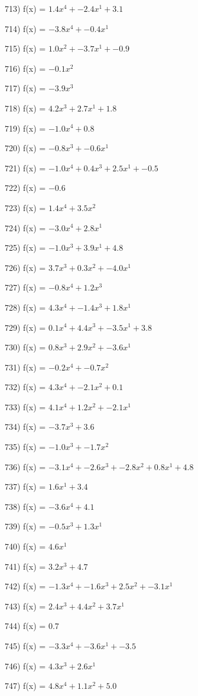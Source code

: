 \documentclass[10pt,a4paper]{article}
\begin{document}
713) f(x) = $1.4x^4 + -2.4x^1 + 3.1$

714) f(x) = $-3.8x^4 + -0.4x^1$

715) f(x) = $1.0x^2 + -3.7x^1 + -0.9$

716) f(x) = $-0.1x^2$

717) f(x) = $-3.9x^3$

718) f(x) = $4.2x^3 + 2.7x^1 + 1.8$

719) f(x) = $-1.0x^4 + 0.8$

720) f(x) = $-0.8x^3 + -0.6x^1$

721) f(x) = $-1.0x^4 + 0.4x^3 + 2.5x^1 + -0.5$

722) f(x) = $-0.6$

723) f(x) = $1.4x^4 + 3.5x^2$

724) f(x) = $-3.0x^4 + 2.8x^1$

725) f(x) = $-1.0x^3 + 3.9x^1 + 4.8$

726) f(x) = $3.7x^3 + 0.3x^2 + -4.0x^1$

727) f(x) = $-0.8x^4 + 1.2x^3$

728) f(x) = $4.3x^4 + -1.4x^3 + 1.8x^1$

729) f(x) = $0.1x^4 + 4.4x^3 + -3.5x^1 + 3.8$

730) f(x) = $0.8x^3 + 2.9x^2 + -3.6x^1$

731) f(x) = $-0.2x^4 + -0.7x^2$

732) f(x) = $4.3x^4 + -2.1x^2 + 0.1$

733) f(x) = $4.1x^4 + 1.2x^2 + -2.1x^1$

734) f(x) = $-3.7x^3 + 3.6$

735) f(x) = $-1.0x^3 + -1.7x^2$

736) f(x) = $-3.1x^4 + -2.6x^3 + -2.8x^2 + 0.8x^1 + 4.8$

737) f(x) = $1.6x^1 + 3.4$

738) f(x) = $-3.6x^4 + 4.1$

739) f(x) = $-0.5x^3 + 1.3x^1$

740) f(x) = $4.6x^1$

741) f(x) = $3.2x^3 + 4.7$

742) f(x) = $-1.3x^4 + -1.6x^3 + 2.5x^2 + -3.1x^1$

743) f(x) = $2.4x^3 + 4.4x^2 + 3.7x^1$

744) f(x) = $0.7$

745) f(x) = $-3.3x^4 + -3.6x^1 + -3.5$

746) f(x) = $4.3x^3 + 2.6x^1$

747) f(x) = $4.8x^4 + 1.1x^2 + 5.0$
\end{document}
